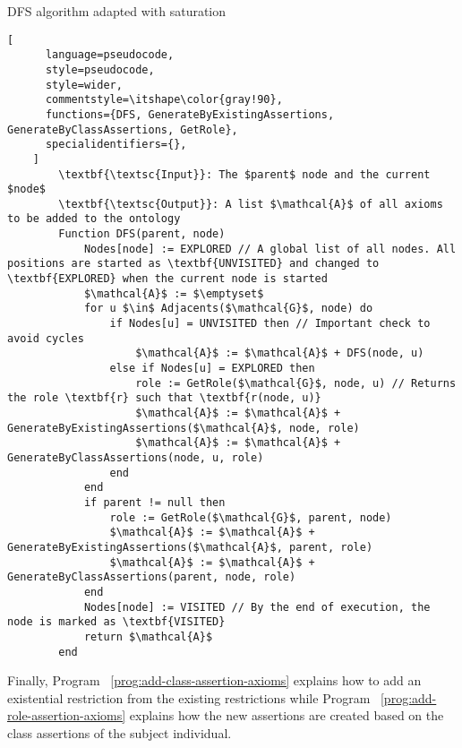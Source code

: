\begin{programruledcaption}{DFS algorithm adapted with saturation\label{prog:dfs-saturation}}
    \begin{lstlisting}[
      language=pseudocode,
      style=pseudocode,
      style=wider,
      commentstyle=\itshape\color{gray!90},
      functions={DFS, GenerateByExistingAssertions, GenerateByClassAssertions, GetRole},
      specialidentifiers={},
    ]
        \textbf{\textsc{Input}}: The $parent$ node and the current $node$
        \textbf{\textsc{Output}}: A list $\mathcal{A}$ of all axioms to be added to the ontology
        Function DFS(parent, node) 
            Nodes[node] := EXPLORED // A global list of all nodes. All positions are started as \textbf{UNVISITED} and changed to \textbf{EXPLORED} when the current node is started
            $\mathcal{A}$ := $\emptyset$ 
            for u $\in$ Adjacents($\mathcal{G}$, node) do
                if Nodes[u] = UNVISITED then // Important check to avoid cycles
                    $\mathcal{A}$ := $\mathcal{A}$ + DFS(node, u)
                else if Nodes[u] = EXPLORED then
                    role := GetRole($\mathcal{G}$, node, u) // Returns the role \textbf{r} such that \textbf{r(node, u)}
                    $\mathcal{A}$ := $\mathcal{A}$ + GenerateByExistingAssertions($\mathcal{A}$, node, role)
                    $\mathcal{A}$ := $\mathcal{A}$ + GenerateByClassAssertions(node, u, role)
                end
            end
            if parent != null then
                role := GetRole($\mathcal{G}$, parent, node)
                $\mathcal{A}$ := $\mathcal{A}$ + GenerateByExistingAssertions($\mathcal{A}$, parent, role)
                $\mathcal{A}$ := $\mathcal{A}$ + GenerateByClassAssertions(parent, node, role)
            end
            Nodes[node] := VISITED // By the end of execution, the node is marked as \textbf{VISITED}
            return $\mathcal{A}$
        end
    \end{lstlisting}
\end{programruledcaption}

Finally, Program ~\ref{prog:add-class-assertion-axioms} explains how to add an existential restriction from the existing restrictions while Program ~\ref{prog:add-role-assertion-axioms} explains how the new assertions are created based on the class assertions of the subject individual.

